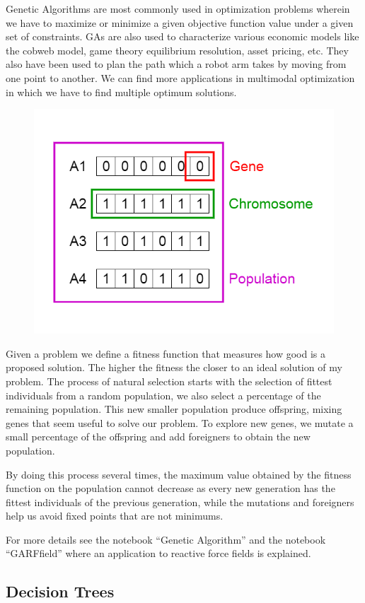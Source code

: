 \documentclass[11pt,letterpaper]{report}
\begin{document}
Genetic Algorithms are most commonly used in optimization problems wherein we have to maximize or minimize a given objective function value under a given set of constraints. GAs are also used to characterize various economic models like the cobweb model, game theory equilibrium resolution, asset pricing, etc. They also have been used to plan the path which a robot arm takes by moving from one point to another. We can find more applications in multimodal optimization in which we have to find multiple optimum solutions.



\begin{figure}[h!]
	\centering
	\includegraphics[width=0.45\linewidth]{figures/GAfigure1.png}
	\caption{}
	\label{fig:GA}
\end{figure} 	


Given a problem we define a fitness function that measures how good is a proposed solution. The higher the fitness the closer to an ideal solution of my problem.
The process of natural selection starts with the selection of fittest individuals from a random population, we also select a percentage of the remaining population. This new smaller population produce offspring, mixing genes that seem useful to solve our problem. To explore new genes, we mutate a small percentage of the offspring and add foreigners to obtain the new population.

By doing this process several times, the maximum value obtained by the fitness function on the population cannot  decrease as every new generation has the fittest individuals of the previous generation, while the mutations and foreigners help us avoid fixed points that are not minimums. 

		
For more details see the notebook ``Genetic Algorithm'' and the notebook ``GARFfield'' where an application to reactive force fields is explained.
 
	 \subsection{Decision Trees}
 
\end{document}

